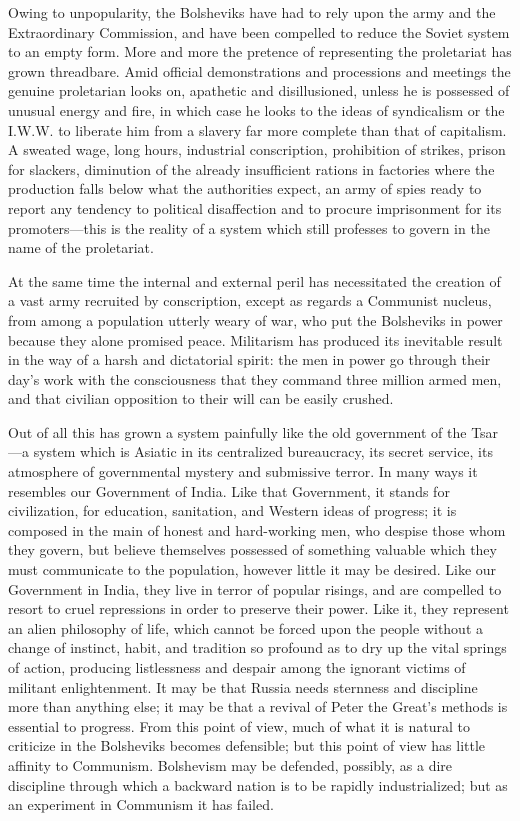 Owing to unpopularity, the Bolsheviks have had to rely upon the army and the Extraordinary Commission, and have been compelled to reduce the Soviet system to an empty form. More and more the pretence of representing the proletariat has grown threadbare. Amid official demonstrations and processions and meetings the genuine proletarian looks on, apathetic and disillusioned, unless he is possessed of unusual energy and fire, in which case he looks to the ideas of syndicalism or the I.W.W. to liberate him from a slavery far more complete than that of capitalism. A sweated wage, long hours, industrial conscription, prohibition of strikes, prison for slackers, diminution of the already insufficient rations in factories where the production falls below what the authorities expect, an army of spies ready to report any tendency to political disaffection and to procure imprisonment for its promoters---this is the reality of a system which still professes to govern in the name of the proletariat.

At the same time the internal and external peril has necessitated the creation of a vast army recruited by conscription, except as regards a Communist nucleus, from among a population utterly weary of war, who put the Bolsheviks in power because they alone promised peace. Militarism has produced its inevitable result in the way of a harsh and dictatorial spirit: the men in power go through their day's work with the consciousness that they command three million armed men, and that civilian opposition to their will can be easily crushed.

Out of all this has grown a system painfully like the old government of the Tsar---a system which is Asiatic in its centralized bureaucracy, its secret service, its atmosphere of governmental mystery and submissive terror. In many ways it resembles our Government of India. Like that Government, it stands for civilization, for education, sanitation, and Western ideas of progress; it is composed in the main of honest and hard-working men, who despise those whom they govern, but believe themselves possessed of something valuable which they must communicate to the population, however little it may be desired. Like our Government in India, they live in terror of popular risings, and are compelled to resort to cruel repressions in order to preserve their power. Like it, they represent an alien philosophy of life, which cannot be forced upon the people without a change of instinct, habit, and tradition so profound as to dry up the vital springs of action, producing listlessness and despair among the ignorant victims of militant enlightenment. It may be that Russia needs sternness and discipline more than anything else; it may be that a revival of Peter the Great's methods is essential to progress. From this point of view, much of what it is natural to criticize in the Bolsheviks becomes defensible; but this point of view has little affinity to Communism. Bolshevism may be defended, possibly, as a dire discipline through which a backward nation is to be rapidly industrialized; but as an experiment in Communism it has failed.


